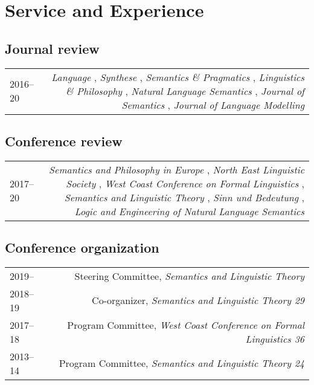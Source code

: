 \documentclass[12pt]{article}
\begin{document}
\medskip

\section*{Service and Experience}

\subsection*{Journal review}

\begin{longtable}{LR}
  2016--20 & 
    \textit{Language}%
    ,
    \textit{Synthese}%
    ,
    \textit{Semantics \& Pragmatics}%
    ,
    \textit{Linguistics \& Philosophy}%
    ,
    \textit{Natural Language Semantics}%
    ,
    \textit{Journal of Semantics}%
    ,
    \textit{Journal of Language Modelling}%
\end{longtable}

\subsection*{Conference review}

\begin{longtable}{LR}
  2017--20 &
    \textit{Semantics and Philosophy in Europe}%
    ,
    \textit{North East Linguistic Society}%
    ,
    \textit{West Coast Conference on Formal Linguistics}%
    ,
    \textit{Semantics and Linguistic Theory}%
    ,
    \textit{Sinn und Bedeutung}%
    ,
    \textit{Logic and Engineering of Natural Language Semantics}%
\end{longtable}

\subsection*{Conference organization}

\begin{longtable}{LR}
  2019--     & Steering Committee, \textit{Semantics and Linguistic Theory}\\
  2018--19   & Co-organizer, \textit{Semantics and Linguistic Theory 29}\\
  2017--18   & Program Committee, \textit{West Coast Conference on Formal
               Linguistics 36}\\
  2013--14   & Program Committee, \textit{Semantics and Linguistic Theory 24}
\end{longtable}
\end{document}
